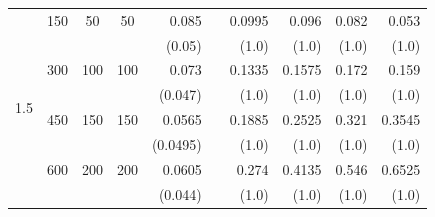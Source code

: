\begin{table}[htbp]
\begin{tabular}{ccccrrrrrr}
            \midrule
        \multirow{8}{*}{1.5}
            & 150 & 50 & 50 & 0.085 &       & 0.0995 & 0.096 & 0.082 & 0.053 \\
            &     &     &     & (0.05) &       & (1.0) & (1.0) & (1.0) & (1.0) \\
            & 300 & 100 & 100 & 0.073 &       & 0.1335 & 0.1575 & 0.172 & 0.159 \\
            &     &     &     & (0.047) &       & (1.0) & (1.0) & (1.0) & (1.0) \\
            & 450 & 150 & 150 & 0.0565 &       & 0.1885 & 0.2525 & 0.321 & 0.3545 \\
            &     &     &     & (0.0495) &       & (1.0) & (1.0) & (1.0) & (1.0) \\
            & 600 & 200 & 200 & 0.0605 &       & 0.274 & 0.4135 & 0.546 & 0.6525 \\
            &     &     &     & (0.044) &       & (1.0) & (1.0) & (1.0) & (1.0) \\

        \bottomrule

    \end{tabular}

\end{table}
